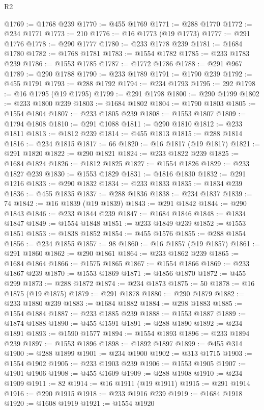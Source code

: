 \begin{lexlean}{R2}
\begin{coremodule}
@1769 := @1768 @239
@1770 := @455 @1769
@1771 := @288 @1770
@1772 := @234 @1771
@1773 := 210
@1776 := @16 @1773 (@19 @1773)
@1777 := @291 @1776
@1778 := @290 @1777
@1780 := @233 @1778 @239
@1781 := @1684 @1780
@1782 := @1768 @1781
@1783 := @1554 @1782
@1785 := @233 @1783 @239
@1786 := @1553 @1785
@1787 := @1772 @1786
@1788 := @291 @967
@1789 := @290 @1788
@1790 := @233 @1789
@1791 := @1790 @239
@1792 := @455 @1791
@1793 := @288 @1792
@1794 := @234 @1793
@1795 := 292
@1798 := @16 @1795 (@19 @1795)
@1799 := @291 @1798
@1800 := @290 @1799
@1802 := @233 @1800 @239
@1803 := @1684 @1802
@1804 := @1790 @1803
@1805 := @1554 @1804
@1807 := @233 @1805 @239
@1808 := @1553 @1807
@1809 := @1794 @1808
@1810 := @291 @1088
@1811 := @290 @1810
@1812 := @233 @1811
@1813 := @1812 @239
@1814 := @455 @1813
@1815 := @288 @1814
@1816 := @234 @1815
@1817 := 66
@1820 := @16 @1817 (@19 @1817)
@1821 := @291 @1820
@1822 := @290 @1821
@1824 := @233 @1822 @239
@1825 := @1684 @1824
@1826 := @1812 @1825
@1827 := @1554 @1826
@1829 := @233 @1827 @239
@1830 := @1553 @1829
@1831 := @1816 @1830
@1832 := @291 @1216
@1833 := @290 @1832
@1834 := @233 @1833
@1835 := @1834 @239
@1836 := @455 @1835
@1837 := @288 @1836
@1838 := @234 @1837
@1839 := 74
@1842 := @16 @1839 (@19 @1839)
@1843 := @291 @1842
@1844 := @290 @1843
@1846 := @233 @1844 @239
@1847 := @1684 @1846
@1848 := @1834 @1847
@1849 := @1554 @1848
@1851 := @233 @1849 @239
@1852 := @1553 @1851
@1853 := @1838 @1852
@1854 := @455 @1576
@1855 := @288 @1854
@1856 := @234 @1855
@1857 := 98
@1860 := @16 @1857 (@19 @1857)
@1861 := @291 @1860
@1862 := @290 @1861
@1864 := @233 @1862 @239
@1865 := @1684 @1864
@1866 := @1575 @1865
@1867 := @1554 @1866
@1869 := @233 @1867 @239
@1870 := @1553 @1869
@1871 := @1856 @1870
@1872 := @455 @299
@1873 := @288 @1872
@1874 := @234 @1873
@1875 := 50
@1878 := @16 @1875 (@19 @1875)
@1879 := @291 @1878
@1880 := @290 @1879
@1882 := @233 @1880 @239
@1883 := @1684 @1882
@1884 := @298 @1883
@1885 := @1554 @1884
@1887 := @233 @1885 @239
@1888 := @1553 @1887
@1889 := @1874 @1888
@1890 := @455 @1591
@1891 := @288 @1890
@1892 := @234 @1891
@1893 := @1590 @1577
@1894 := @1554 @1893
@1896 := @233 @1894 @239
@1897 := @1553 @1896
@1898 := @1892 @1897
@1899 := @455 @314
@1900 := @288 @1899
@1901 := @234 @1900
@1902 := @313 @1715
@1903 := @1554 @1902
@1905 := @233 @1903 @239
@1906 := @1553 @1905
@1907 := @1901 @1906
@1908 := @455 @1609
@1909 := @288 @1908
@1910 := @234 @1909
@1911 := 82
@1914 := @16 @1911 (@19 @1911)
@1915 := @291 @1914
@1916 := @290 @1915
@1918 := @233 @1916 @239
@1919 := @1684 @1918
@1920 := @1608 @1919
@1921 := @1554 @1920

\end{coremodule}
\end{lexlean}
